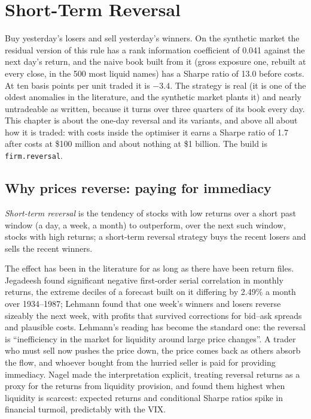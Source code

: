 \chapter{Short-Term Reversal}\label{ch:s1:short-term-reversal}

Buy yesterday's losers and sell yesterday's winners. On the synthetic market the residual version of this rule has a rank information coefficient of 0.041
against the next day's return, and the naive book built from it (gross exposure one, rebuilt at every close, in the 500 most liquid names) has a Sharpe ratio of
13.0 before costs. At ten basis points per unit traded it is $-3.4$. The strategy is real (it is one of the oldest anomalies in the literature, and the
synthetic market plants it) and nearly untradeable as written, because it turns over three quarters of its book every day. This chapter is about the one-day
reversal and its variants, and above all about how it is traded: with costs inside the optimiser it earns a Sharpe ratio of 1.7 after costs at \$100 million
and about nothing at \$1 billion. The build is \texttt{firm.reversal}.

\section{Why prices reverse: paying for immediacy}

\begin{definition}\label{def:s1:short-term-reversal:reversal}
\emph{Short-term reversal} is the tendency of stocks with low returns over a short past window (a day, a week, a month) to
outperform, over the next such window, stocks with high returns; a short-term reversal strategy buys the recent losers and sells the recent winners.
\end{definition}

The effect has been in the literature for as long as there have been return files. Jegadeesh found significant negative first-order serial correlation in
monthly returns, the extreme deciles of a forecast built on it differing by 2.49\% a month over 1934--1987; Lehmann found that one week's winners and losers
reverse sizeably the next week, with profits that survived corrections for bid--ask spreads and plausible costs. Lehmann's reading has become the standard one:
the reversal is ``inefficiency in the market for liquidity around large price changes''. A trader who must sell now pushes the price down, the price comes
back as others absorb the flow, and whoever bought from the hurried seller is paid for providing immediacy. Nagel made the interpretation explicit, treating
reversal returns as a proxy for the returns from liquidity provision, and found them highest when liquidity is scarcest: expected returns and conditional
Sharpe ratios spike in financial turmoil, predictably with the VIX.

